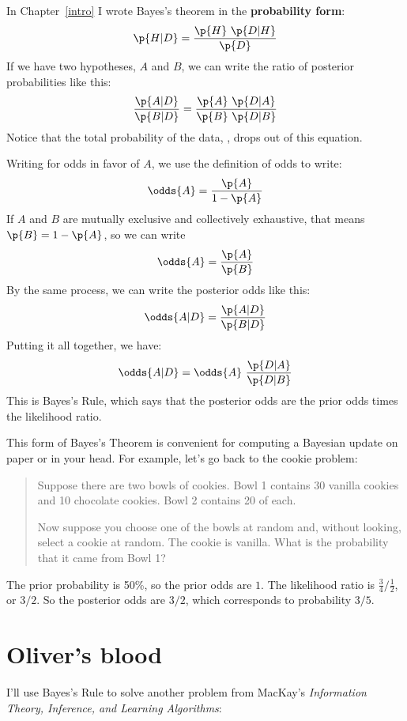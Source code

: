 \documentclass[12pt]{book}
\theoremstyle{exercise}
\begin{document}

In Chapter~\ref{intro} I wrote Bayes's theorem in the {\bf probability
form}:
%
\[ \p{H|D} = \frac{\p{H}~\p{D|H}}{\p{D}} \]
%
If we have two hypotheses, $A$ and $B$, 
we can write the ratio of posterior probabilities like this:
%
\[ \frac{\p{A|D}}{\p{B|D}} = \frac{\p{A}~\p{D|A}}
                                        {\p{B}~\p{D|B}} \]
%
Notice that the total probability of the data, , drops out of
this equation.

Writing  for odds in favor of $A$, we use the definition of odds to write:
%
\[ \odds{A} = \frac{\p{A}}{1-\p{A}} \]
%
If $A$ and $B$ are mutually exclusive and collectively exhaustive,
that means $\p{B} = 1 - \p{A}$, so we can write
%
\[ \odds{A} = \frac{\p{A}}{\p{B}}  \]
%
By the same process, we can write the posterior odds like this:
%
\[ \odds{A|D} = \frac{\p{A|D}}{\p{B|D}}  \]
%
Putting it all together, we have:
%
\[ \odds{A|D} = \odds{A}~\frac{\p{D|A}}{\p{D|B}} \]
%
This is Bayes's Rule, which says that the posterior odds are the prior odds times the likelihood ratio.  

This form of Bayes's Theorem is convenient for computing a Bayesian update on paper or in your head.  
For example, let's go back to the cookie problem:

\begin{quote}
Suppose there are two bowls of cookies.  
Bowl 1 contains 30 vanilla cookies and 10 chocolate cookies.
Bowl 2 contains 20 of each.

Now suppose you choose one of the bowls at random and, without
looking, select a cookie at random.  
The cookie is vanilla.  
What is the probability that it came from Bowl 1?
\end{quote}

The prior probability is 50\%, so the prior odds are $1$.
The likelihood ratio is $\frac{3}{4} / \frac{1}{2}$, or $3/2$.
So the posterior odds are $3/2$, which corresponds to probability
$3/5$.


\section{Oliver's blood}
\label{oliver}


I'll use Bayes's Rule to solve another problem from MacKay's {\it Information Theory, Inference, and Learning Algorithms}:
\end{document}
